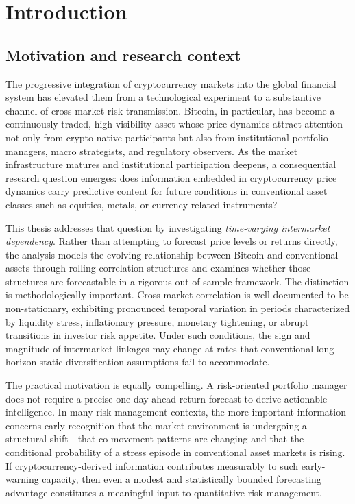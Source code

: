 \section{Introduction}

\subsection{Motivation and research context}

The progressive integration of cryptocurrency markets into the global financial system has elevated them from a technological experiment to a substantive channel of cross-market risk transmission. Bitcoin, in particular, has become a continuously traded, high-visibility asset whose price dynamics attract attention not only from crypto-native participants but also from institutional portfolio managers, macro strategists, and regulatory observers. As the market infrastructure matures and institutional participation deepens, a consequential research question emerges: does information embedded in cryptocurrency price dynamics carry predictive content for future conditions in conventional asset classes such as equities, metals, or currency-related instruments?

This thesis addresses that question by investigating \emph{time-varying intermarket dependency}. Rather than attempting to forecast price levels or returns directly, the analysis models the evolving relationship between Bitcoin and conventional assets through rolling correlation structures and examines whether those structures are forecastable in a rigorous out-of-sample framework. The distinction is methodologically important. Cross-market correlation is well documented to be non-stationary, exhibiting pronounced temporal variation in periods characterized by liquidity stress, inflationary pressure, monetary tightening, or abrupt transitions in investor risk appetite. Under such conditions, the sign and magnitude of intermarket linkages may change at rates that conventional long-horizon static diversification assumptions fail to accommodate.

The practical motivation is equally compelling. A risk-oriented portfolio manager does not require a precise one-day-ahead return forecast to derive actionable intelligence. In many risk-management contexts, the more important information concerns early recognition that the market environment is undergoing a structural shift---that co-movement patterns are changing and that the conditional probability of a stress episode in conventional asset markets is rising. If cryptocurrency-derived information contributes measurably to such early-warning capacity, then even a modest and statistically bounded forecasting advantage constitutes a meaningful input to quantitative risk management.

